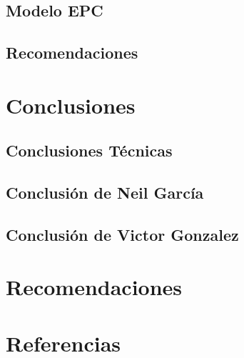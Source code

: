 \documentclass[12pt,letterpaper]{article}
\begin{document}
\subsection{Modelo EPC}

\subsection{Recomendaciones}

\section{Conclusiones}

\subsection{Conclusiones Técnicas}

\subsection{Conclusión de Neil García}

\subsection{Conclusión de Victor Gonzalez}

\section{Recomendaciones}

\section{Referencias}
\end{document}
